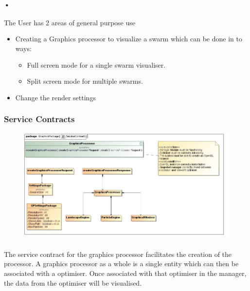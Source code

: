 \documentclass[11pt]{article}
\begin{document}
\paragraph{•}
The User has 2 areas of general purpose use
\begin{itemize}
\item Creating a Graphics processor to visualize a swarm which can be done in to ways:
\begin{itemize}
\item Full screen mode for a single swarm visualiser.
\item Split screen mode for multiple swarms.
\end{itemize}
\item Change the render settings
\end{itemize}

\subsubsection{Service Contracts}
\begin{figure}[H]
\includegraphics[scale=0.45]{GraphicsProcessor/ServiceContract.jpg}
\end{figure}
The service contract for the graphics processor facilitates the creation of the processor. A graphics processor as a whole is a single entity which can then be associated with a optimiser. Once associated with that optimiser in the manager, the data from the optimiser will be visualised. 
\end{document}
